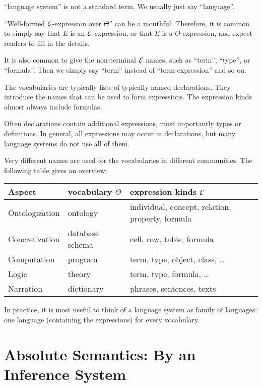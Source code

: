 \begin{remark}[Terminology]
``language system'' is not a standard term. We usually just say ``language''.

``Well-formed $\mathcal{E}$-expression over $\Theta$'' can be a mouthful.
Therefore, it is common to simply say that $E$ is an $\mathcal{E}$-expression, or that $E$ is a $\Theta$-expression, and expect readers to fill in the details.

It is also common to give the non-terminal $\mathcal{E}$ names, such as ``term'', ``type'', or ``formula''.
Then we simply say ``term'' instead of ``term-expression'' and so on.
\end{remark}

The vocabularies are typically lists of typically named declarations.
They introduce the names that can be used to form expressions.
The expression kinds almost always include formulas.

Often declarations contain additional expressions, most importantly types or definitions.
In general, all expressions may occur in declarations, but many language systems do not use all of them.

Very different names are used for the vocabularies in different communities.
The following table gives an overview:

\begin{center}
\begin{tabular}{lll}
\toprule
Aspect & vocabulary $\Theta$ & expression kinds $\mathcal{E}$ \\
\midrule
Ontologization  & ontology & individual, concept, relation, property, formula \\
Concretization & database schema & cell, row, table, formula \\
Computation & program & term, type, object, class, \ldots \\
Logic & theory & term, type, formula, \ldots \\
Narration & dictionary & phrases, sentences, texts \\
\bottomrule
\end{tabular}
\end{center}

In practice, it is most useful to think of a language system as family of languages: one language (containing the expressions) for every vocabulary.

\section{Absolute Semantics: By an Inference System}

